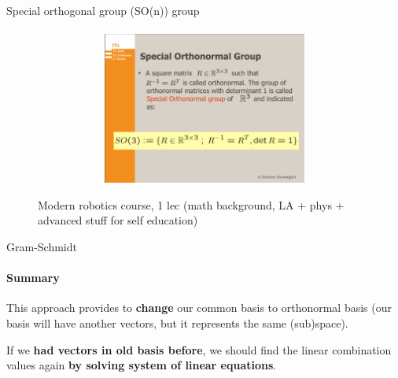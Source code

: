 \documentclass[aspectratio=169]{beamer}
\newcommand{\fbckg}[1]{\usebackgroundtemplate{\texttt{[image: \#1]}}}%
\begin{document}
\begin{frame}[t]{Special orthogonal group (SO(n)) group}
\framesubtitle{}
\begin{figure}[H]
    \href{https://disk.yandex.ru/i/XD6o-ZIGS4yLvA}{\centering\includegraphics[height=5cm,width=1\textwidth,keepaspectratio]{course_modern.png}}
    \caption*{Modern robotics course, 1 lec (math background, LA + phys + advanced stuff for self education)}
    \label{fig:course_modern.png}
\end{figure}
\end{frame}

\begin{frame}[t]{Gram-Schmidt}
\framesubtitle{Summary}
    \Large
    This approach provides to \textbf{change} our \alert{common basis} to \alert{orthonormal basis} (our basis will have another vectors, but it represents the same (sub)space). 

If we \textbf{had vectors in old basis before}, we should find the linear combination values again \textbf{by solving system of linear equations}.

\end{frame}



\usebackgroundtemplate{}

\fbckg{fibeamer/figs/common.png}
\end{document}
